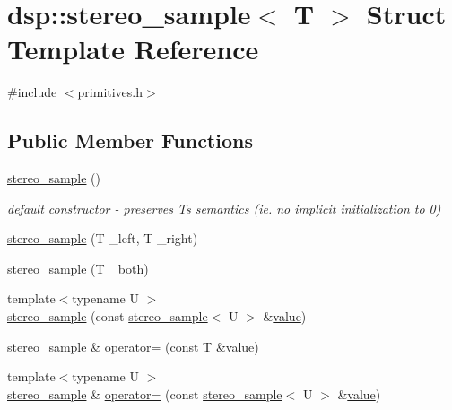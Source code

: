 \hypertarget{structdsp_1_1stereo__sample}{}\section{dsp\+:\+:stereo\+\_\+sample$<$ T $>$ Struct Template Reference}
\label{structdsp_1_1stereo__sample}


{\ttfamily \#include $<$primitives.\+h$>$}

\subsection*{Public Member Functions}
\begin{DoxyCompactItemize}
\item 
\hyperlink{structdsp_1_1stereo__sample_a70acefe335f719b3e6e3e277050da752}{stereo\+\_\+sample} ()
\begin{DoxyCompactList}\small\item\em default constructor -\/ preserves T\textquotesingle{}s semantics (ie. no implicit initialization to 0) \end{DoxyCompactList}\item 
\hyperlink{structdsp_1_1stereo__sample_ac56c19e0d3a0deee6a318bff34b8bf48}{stereo\+\_\+sample} (T \+\_\+left, T \+\_\+right)
\item 
\hyperlink{structdsp_1_1stereo__sample_a73795bccf46a690a4cfad057866ee7c8}{stereo\+\_\+sample} (T \+\_\+both)
\item 
{\footnotesize template$<$typename U $>$ }\\\hyperlink{structdsp_1_1stereo__sample_a3e9b0be236fb44d0b9ff9a33aee7d151}{stereo\+\_\+sample} (const \hyperlink{structdsp_1_1stereo__sample}{stereo\+\_\+sample}$<$ U $>$ \&\hyperlink{tk_8h_a177a0765f574ef6642002696d9cd82d0}{value})
\item 
\hyperlink{structdsp_1_1stereo__sample}{stereo\+\_\+sample} \& \hyperlink{structdsp_1_1stereo__sample_a57ba82d63fdb251fbe74cfbaefd45ac0}{operator=} (const T \&\hyperlink{tk_8h_a177a0765f574ef6642002696d9cd82d0}{value})
\item 
{\footnotesize template$<$typename U $>$ }\\\hyperlink{structdsp_1_1stereo__sample}{stereo\+\_\+sample} \& \hyperlink{structdsp_1_1stereo__sample_a4af279aca9661aecaa5979420e25720a}{operator=} (const \hyperlink{structdsp_1_1stereo__sample}{stereo\+\_\+sample}$<$ U $>$ \&\hyperlink{tk_8h_a177a0765f574ef6642002696d9cd82d0}{value})
\item 

\end{DoxyCompactItemize}
